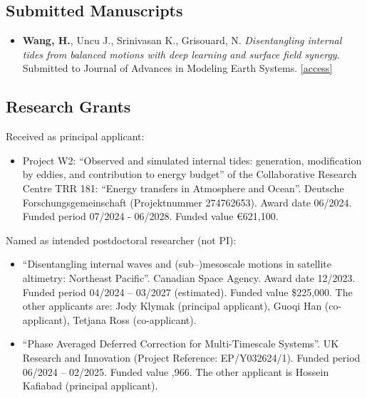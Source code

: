 \documentclass[a4paper,12pt]{article}
\begin{document}
\subsection{Submitted Manuscripts}
\begin{itemize}
\item \textbf{Wang, H.}, Uncu J., Srinivasan K., Grisouard, N. \textit{Disentangling internal tides from balanced motions with deep learning and surface field synergy}. Submitted to  Journal of Advances in Modeling Earth Systems. \href{https://arxiv.org/html/2511.03614v1}{[access]}
\end{itemize}

\subsection{Research Grants}
Received as principal applicant:
\begin{itemize}[leftmargin=*,noitemsep]
\item Project W2: ``Observed and simulated internal tides: generation, modification by eddies, and contribution to energy budget'' of the Collaborative Research Centre TRR 181:  ``Energy transfers in Atmosphere and Ocean''. Deutsche Forschungsgemeinschaft (Projektnummer 274762653).  Award date  06/2024. Funded period 07/2024 - 06/2028. Funded value \euro 621,100. 
\end{itemize}
Named as intended postdoctoral researcher (not PI):
\begin{itemize}[leftmargin=*,noitemsep]
\item ``Disentangling internal waves and (sub–)mesoscale motions in satellite altimetry: Northeast Pacific”. Canadian Space Agency.  Award date 12/2023.  Funded period 04/2024 – 03/2027 (estimated). Funded value \$225,000. The other applicants are: Jody Klymak (principal applicant), Guoqi Han (co-applicant), Tetjana Ross (co-applicant). 
\item``Phase Averaged Deferred Correction for Multi-Timescale Systems”. UK Research and Innovation (Project Reference: EP/Y032624/1). Funded period 06/2024 – 02/2025. Funded value ,966. The other applicant is Hossein Kafiabad (principal applicant). 
\end{itemize}
\end{document}
